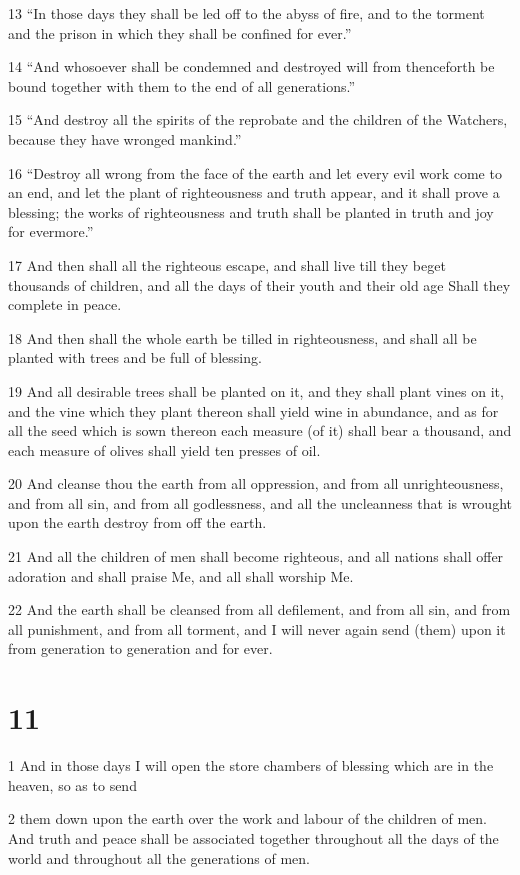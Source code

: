 \par 13 “In those days they shall be led off to the abyss of fire, and to the torment and the prison in which they shall be confined for ever.”
\par 14 “And whosoever shall be condemned and destroyed will from thenceforth be bound together with them to the end of all generations.”
\par 15 “And destroy all the spirits of the reprobate and the children of the Watchers, because they have wronged mankind.”
\par 16 “Destroy all wrong from the face of the earth and let every evil work come to an end, and let the plant of righteousness and truth appear, and it shall prove a blessing; the works of righteousness and truth shall be planted in truth and joy for evermore.”
\par 17 And then shall all the righteous escape, and shall live till they beget thousands of children, and all the days of their youth and their old age Shall they complete in peace.
\par 18 And then shall the whole earth be tilled in righteousness, and shall all be planted with trees and be full of blessing.
\par 19 And all desirable trees shall be planted on it, and they shall plant vines on it, and the vine which they plant thereon shall yield wine in abundance, and as for all the seed which is sown thereon each measure (of it) shall bear a thousand, and each measure of olives shall yield ten presses of oil.
\par 20 And cleanse thou the earth from all oppression, and from all unrighteousness, and from all sin, and from all godlessness, and all the uncleanness that is wrought upon the earth destroy from off the earth.
\par 21 And all the children of men shall become righteous, and all nations shall offer adoration and shall praise Me, and all shall worship Me.
\par 22 And the earth shall be cleansed from all defilement, and from all sin, and from all punishment, and from all torment, and I will never again send (them) upon it from generation to generation and for ever.

\chapter{11}

\par 1 And in those days I will open the store chambers of blessing which are in the heaven, so as to send
\par 2 them down upon the earth over the work and labour of the children of men. And truth and peace shall be associated together throughout all the days of the world and throughout all the generations of men.

